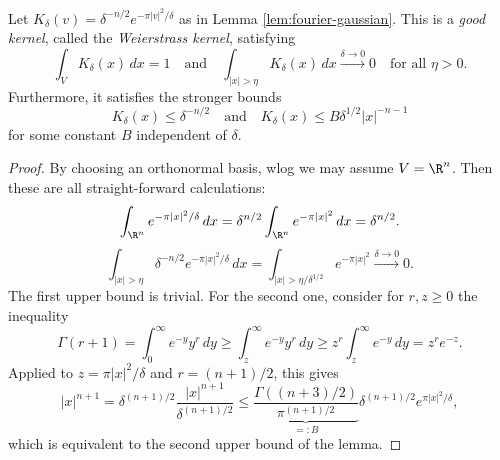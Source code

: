 \begin{lemma}
\label{lem:weierstrass-kernel}
\uses{}
\lean{}
Let $K_\delta(v)=\delta^{-n/2}e^{-\pi|v|^2/\delta}$
as in Lemma \ref{lem:fourier-gaussian}. This is a
\emph{good kernel}, called the \emph{Weierstrass kernel}, satisfying
$$\int_{V}K_\delta(x)\,dx= 1\quad\text{and}\quad
\int_{|x|>\eta}K_\delta(x)\,dx\xrightarrow{\delta\to0}0\quad\text{for all }\eta>0.$$
Furthermore, it satisfies the stronger bounds
$$K_\delta(x)\leq \delta^{-n/2}\quad\text{and}\quad K_\delta(x)\leq B\delta^{1/2}|x|^{-n-1}$$ for
some constant $B$ independent of $\delta$.
\end{lemma}
\begin{proof}
  By choosing an orthonormal basis, wlog we may assume $V=\R^n$. Then these are all straight-forward calculations:
  $$\int_{\R^n}e^{-\pi|x|^2/\delta}\,dx=\delta^{n/2}\int_{\R^n}e^{-\pi|x|^2}\,dx=\delta^{n/2}.$$
  $$\int_{|x|>\eta}\delta^{-n/2}e^{-\pi|x|^2/\delta}\,dx=\int_{|x|>\eta/\delta^{1/2}}e^{-\pi|x|^2}\xrightarrow{\delta\to0}0.$$
  The first upper bound is trivial. For the second one, consider for $r,z\geq0$ the inequality
  $$\Gamma(r+1)=\int_0^\infty e^{-y}y^r\,dy\geq\int_z^\infty e^{-y}y^r\,dy\geq z^r\int_z^\infty e^{-y}\,dy=z^re^{-z}.$$
  Applied to $z=\pi|x|^2/\delta$ and $r=(n+1)/2$, this gives
  $$|x|^{n+1}=\delta^{(n+1)/2}\frac{|x|^{n+1}}{\delta^{(n+1)/2}}\leq
  \underbrace{\frac{\Gamma((n+3)/2)}{\pi^{(n+1)/2}}}_{=:B}\delta^{(n+1)/2}e^{\pi|x|^2/\delta},$$
  which is equivalent to the second upper bound of the lemma.
\end{proof}

